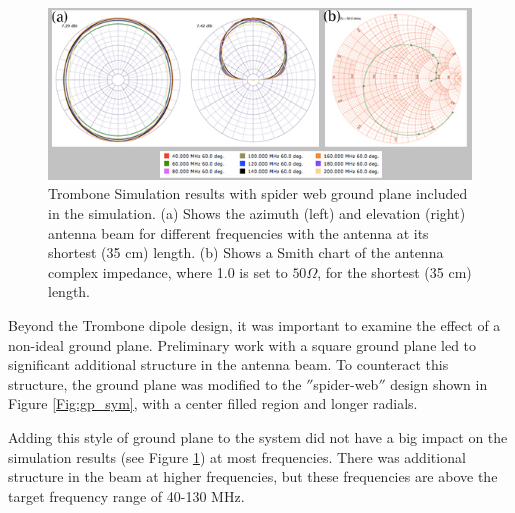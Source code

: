 \begin{figure}[htb]
\begin{center}
\includegraphics[width=0.95\linewidth]{SCIHI_system/figures/trombone_gp.jpg}
\caption{Trombone Simulation results with spider web ground plane included in the simulation. (a) Shows the azimuth (left) and elevation (right) antenna beam for different frequencies with the antenna at its shortest (35 cm) length. (b) Shows a Smith chart of the antenna complex impedance, where 1.0 is set to $50 \Omega$, for the shortest (35 cm) length.}
\label{Fig:trsym_gp}
\end{center}
\end{figure}

Beyond the Trombone dipole design, it was important to examine the effect of a non-ideal ground plane. Preliminary work with a square ground plane led to significant additional structure in the antenna beam. To counteract this structure, the ground plane was modified to the $''$spider-web$''$ design shown in Figure \ref{Fig:gp_sym}, with a center filled region and longer radials. 

Adding this style of ground plane to the system did not have a big impact on the simulation results (see Figure \ref{Fig:trsym_gp}) at most frequencies. There was additional structure in the beam at higher frequencies, but these frequencies are above the target frequency range of 40-130 MHz.  

